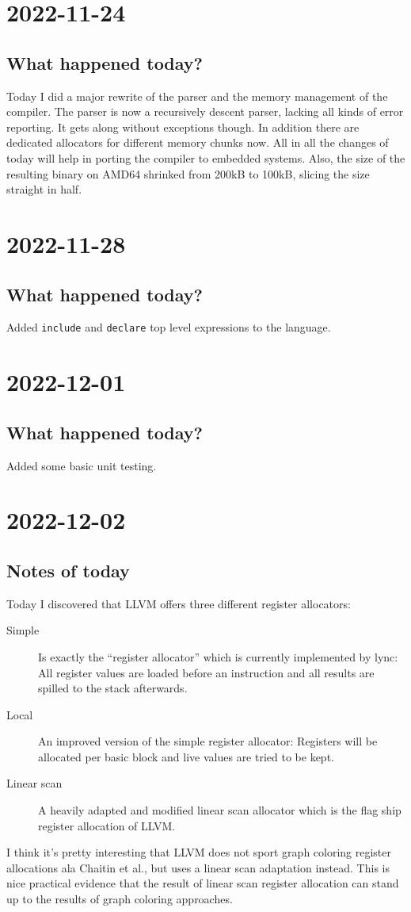 \documentclass[12pt, article]{article}
\begin{document}
\section{2022-11-24}

\subsection{What happened today?}

Today I did a major rewrite of the parser and the memory management of
the compiler.
The parser is now a recursively descent parser, lacking all kinds of
error reporting.
It gets along without exceptions though.
In addition there are dedicated allocators for different memory chunks
now.
All in all the changes of today will help in porting the compiler to
embedded systems.
Also, the size of the resulting binary on AMD64 shrinked from 200kB to
100kB, slicing the size straight in half.

\section{2022-11-28}

\subsection{What happened today?}

Added \texttt{include} and \texttt{declare} top level expressions to
the language.

\section{2022-12-01}

\subsection{What happened today?}

Added some basic unit testing.

\section{2022-12-02}

\subsection{Notes of today}

Today I discovered that LLVM offers three different register
allocators:
\begin{description}
\item[Simple] Is exactly the ``register allocator'' which is currently
  implemented by lync:
  All register values are loaded before an instruction and all results
  are spilled to the stack afterwards.
\item[Local] An improved version of the simple register allocator:
  Registers will be allocated per basic block and live values are
  tried to be kept.
\item[Linear scan] A heavily adapted and modified linear scan
  allocator which is the flag ship register allocation of LLVM.
\end{description}

I think it's pretty interesting that LLVM does not sport graph
coloring register allocations ala Chaitin et al., but uses a linear
scan adaptation instead.
This is nice practical evidence that the result of linear scan
register allocation can stand up to the results of graph coloring
approaches.
\end{document}
